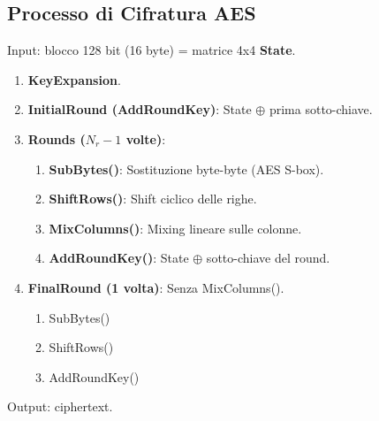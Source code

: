 \subsection{Processo di Cifratura AES}
Input: blocco 128 bit (16 byte) = matrice 4x4 \textbf{State}.
\begin{enumerate}
    \item \textbf{KeyExpansion}.
    \item \textbf{InitialRound (AddRoundKey)}: State $\oplus$ prima sotto-chiave.
    \item \textbf{Rounds ($N_r-1$ volte)}:
    \begin{enumerate}
        \item \textbf{SubBytes()}: Sostituzione byte-byte (AES S-box).
        \item \textbf{ShiftRows()}: Shift ciclico delle righe.
        \item \textbf{MixColumns()}: Mixing lineare sulle colonne.
        \item \textbf{AddRoundKey()}: State $\oplus$ sotto-chiave del round.
    \end{enumerate}
    \item \textbf{FinalRound (1 volta)}: Senza MixColumns().
    \begin{enumerate}
        \item SubBytes()
        \item ShiftRows()
        \item AddRoundKey()
    \end{enumerate}
\end{enumerate}
Output: ciphertext.

